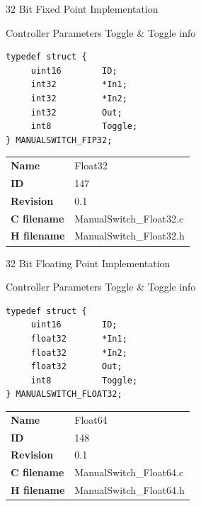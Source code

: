32 Bit Fixed Point Implementation

\begin{XtoCtabular}{Controller Parameters}
Toggle & Toggle info\tabularnewline
\hline
\end{XtoCtabular}

\begin{lstlisting}
typedef struct {
     uint16        ID;
     int32         *In1;
     int32         *In2;
     int32         Out;
     int8          Toggle;
} MANUALSWITCH_FIP32;
\end{lstlisting}

\ifdefined \AddTestReports
{}
\fi
{}
\nopagebreak[0]
\begin{tabular}{l l}
\textbf{Name} & Float32 \tabularnewline
\textbf{ID} & 147 \tabularnewline
\textbf{Revision} & 0.1 \tabularnewline
\textbf{C filename} & ManualSwitch\_Float32.c \tabularnewline
\textbf{H filename} & ManualSwitch\_Float32.h \tabularnewline
\end{tabular}
\vspace{1ex}

32 Bit Floating Point Implementation

\begin{XtoCtabular}{Controller Parameters}
Toggle & Toggle info\tabularnewline
\hline
\end{XtoCtabular}

\begin{lstlisting}
typedef struct {
     uint16        ID;
     float32       *In1;
     float32       *In2;
     float32       Out;
     int8          Toggle;
} MANUALSWITCH_FLOAT32;
\end{lstlisting}

\ifdefined \AddTestReports
{}
\fi
{}
\nopagebreak[0]
\begin{tabular}{l l}
\textbf{Name} & Float64 \tabularnewline
\textbf{ID} & 148 \tabularnewline
\textbf{Revision} & 0.1 \tabularnewline
\textbf{C filename} & ManualSwitch\_Float64.c \tabularnewline
\textbf{H filename} & ManualSwitch\_Float64.h \tabularnewline
\end{tabular}
\vspace{1ex}

